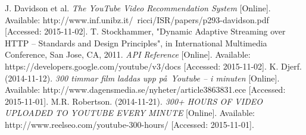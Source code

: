 \begin{thebibliography}{5}
        J. Davidson et al.
        \textit{The YouTube Video Recommendation System}
        [Online].
        Available:
        http://www.inf.unibz.it/~ricci/ISR/papers/p293-davidson.pdf
        [Accessed: 2015-11-02].
        T. Stockhammer,
        "Dynamic Adaptive Streaming over HTTP – Standards and Design Principles",
        in International Multimedia Conference,
        San Jose, CA,
        2011.
        \textit{API Reference}
        [Online].
        Available:
        https://developers.google.com/youtube/v3/docs
        [Accessed: 2015-11-02].
        K. Djerf.
        (2014-11-12).
        \textit{300 timmar film laddas upp p\aa\  Youtube – i minuten}
        [Online].
        Available:
        http://www.dagensmedia.se/nyheter/article3863831.ece
        [Accessed: 2015-11-01].
        M.R. Robertson.
        (2014-11-21).
        \textit{300+ HOURS OF VIDEO UPLOADED TO YOUTUBE EVERY MINUTE}
        [Online].
        Available:
        http://www.reelseo.com/youtube-300-hours/
        [Accessed: 2015-11-01].
\end{thebibliography}
